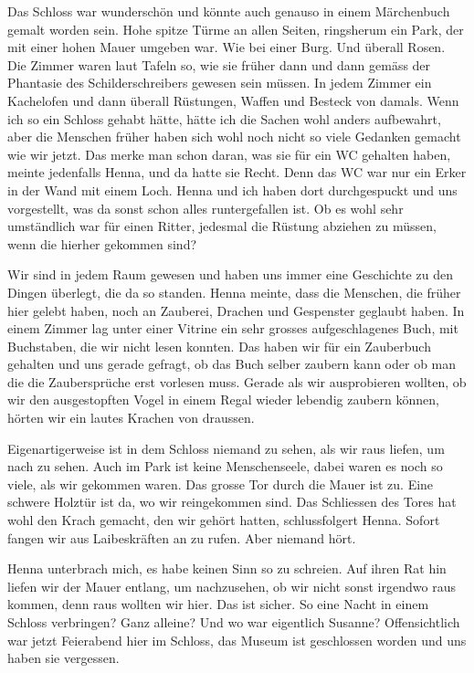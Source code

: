 Das Schloss war wunderschön und könnte auch genauso in einem Märchenbuch gemalt worden sein. Hohe spitze Türme an allen Seiten, ringsherum ein Park, der mit einer hohen Mauer umgeben war. Wie bei einer Burg. Und überall Rosen. Die Zimmer waren laut Tafeln so, wie sie früher dann und dann gemäss der Phantasie des Schilderschreibers gewesen sein müssen. In jedem Zimmer ein Kachelofen und dann überall Rüstungen, Waffen und Besteck von damals. Wenn ich so ein Schloss gehabt hätte, hätte ich die Sachen wohl anders aufbewahrt, aber die Menschen früher haben sich wohl noch nicht so viele Gedanken gemacht wie wir jetzt. Das merke man schon daran, was sie für ein WC gehalten haben, meinte jedenfalls Henna, und da hatte sie Recht. Denn das WC war nur ein Erker in der Wand mit einem Loch. Henna und ich haben dort durchgespuckt und uns vorgestellt, was da sonst schon alles runtergefallen ist. Ob es wohl sehr umständlich war für einen Ritter, jedesmal die Rüstung abziehen zu müssen, wenn die hierher gekommen sind?

Wir sind in jedem Raum gewesen und haben uns immer eine Geschichte zu den Dingen überlegt, die da so standen. Henna meinte, dass die Menschen, die früher hier gelebt haben, noch an Zauberei, Drachen und Gespenster geglaubt haben. In einem Zimmer lag unter einer Vitrine ein sehr grosses aufgeschlagenes Buch, mit Buchstaben, die wir nicht lesen konnten. Das haben wir für ein Zauberbuch gehalten und uns gerade gefragt, ob das Buch selber zaubern kann oder ob man die die Zaubersprüche erst vorlesen muss. Gerade als wir ausprobieren wollten, ob wir den ausgestopften Vogel in einem Regal wieder lebendig zaubern können, hörten wir ein lautes Krachen von draussen.

Eigenartigerweise ist in dem Schloss niemand zu sehen, als wir raus liefen, um nach zu sehen. Auch im Park ist keine Menschenseele, dabei waren es noch so viele, als wir gekommen waren. Das grosse Tor durch die Mauer ist zu. Eine schwere Holztür ist da, wo wir reingekommen sind. Das Schliessen des Tores hat wohl den Krach gemacht, den wir gehört hatten, schlussfolgert Henna. Sofort fangen wir aus Laibeskräften an zu rufen. Aber niemand hört.

Henna unterbrach mich, es habe keinen Sinn so zu schreien. Auf ihren Rat hin liefen wir der Mauer entlang, um nachzusehen, ob wir nicht sonst irgendwo raus kommen, denn raus wollten wir hier. Das ist sicher. So eine Nacht in einem Schloss verbringen? Ganz alleine? Und wo war eigentlich Susanne? Offensichtlich war jetzt Feierabend hier im Schloss, das Museum ist geschlossen worden und uns haben sie vergessen.

